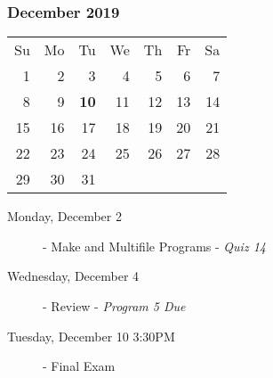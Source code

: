 \subsubsection*{December 2019}
\begin{tabular}{rrrrrrr}
Su & Mo & Tu & We & Th & Fr & Sa\\
 1 &  2 &  3 &  4 &  5 &  6 &  7\\
 8 &  9 & {\bf 10} & 11 & 12 & 13 & 14\\
15 & 16 & 17 & 18 & 19 & 20 & 21\\
22 & 23 & 24 & 25 & 26 & 27 & 28\\
29 & 30 & 31 &    &    &    &   \\
\end{tabular}
\begin{description}
\item[Monday, December 2]
  - Make and Multifile Programs
  \newline- {\em Quiz 14}
\item[Wednesday, December 4]
  - Review
  \newline- {\em Program 5 Due}
\item[Tuesday, December 10 3:30PM] 
  - Final Exam
\end{description}
\hrulefill
